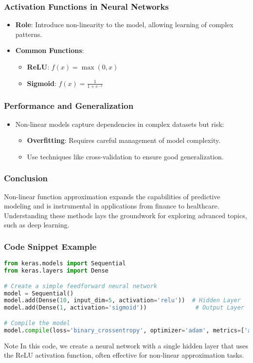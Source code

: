 \documentclass[aspectratio=169]{beamer}
\begin{document}
\begin{frame}[fragile]
  \frametitle{Activation Functions in Neural Networks}
  \begin{itemize}
    \item \textbf{Role}: Introduce non-linearity to the model, allowing learning of complex patterns.
    \item \textbf{Common Functions}:
      \begin{itemize}
        \item \textbf{ReLU}: \( f(x) = \max(0, x) \)
        \item \textbf{Sigmoid}: \( f(x) = \frac{1}{1 + e^{-x}} \)
      \end{itemize}
  \end{itemize}
\end{frame}

\begin{frame}[fragile]
  \frametitle{Performance and Generalization}
  \begin{itemize}
    \item Non-linear models capture dependencies in complex datasets but risk:
    \begin{itemize}
      \item \textbf{Overfitting}: Requires careful management of model complexity.
      \item Use techniques like cross-validation to ensure good generalization.
    \end{itemize}
  \end{itemize}
\end{frame}

\begin{frame}[fragile]
  \frametitle{Conclusion}
  Non-linear function approximation expands the capabilities of predictive modeling and is instrumental in applications from finance to healthcare. Understanding these methods lays the groundwork for exploring advanced topics, such as deep learning.
\end{frame}

\begin{frame}[fragile]
  \frametitle{Code Snippet Example}
  \begin{lstlisting}[language=Python]
from keras.models import Sequential
from keras.layers import Dense

# Create a simple feedforward neural network
model = Sequential()
model.add(Dense(10, input_dim=5, activation='relu'))  # Hidden Layer
model.add(Dense(1, activation='sigmoid'))              # Output Layer

# Compile the model
model.compile(loss='binary_crossentropy', optimizer='adam', metrics=['accuracy'])
  \end{lstlisting}
  \begin{block}{Note}
    In this code, we create a neural network with a single hidden layer that uses the ReLU activation function, often effective for non-linear approximation tasks.
  \end{block}
\end{frame}
\end{document}
